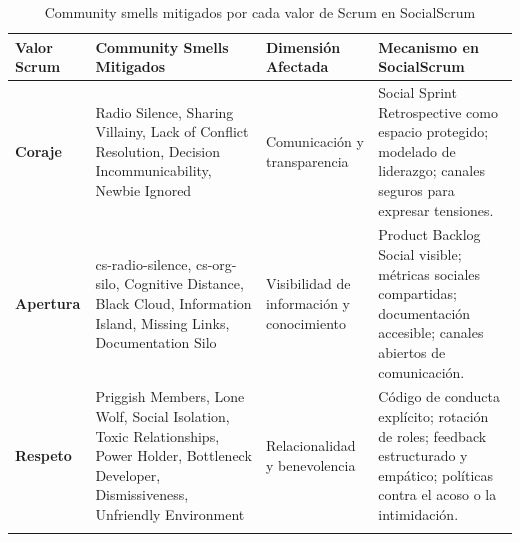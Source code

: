 \begin{table}[!htbp]
    \caption{Community smells mitigados por cada valor de Scrum en SocialScrum \cite{caballero2022communitysmells}}
    \label{tab:valores_smells}
    \centering
    \small
    \begin{tabular}{@{}p{2.2cm}p{4.2cm}p{3.2cm}p{4.3cm}@{}}
        \toprule
        \textbf{Valor Scrum}                                                                                                                                  & \textbf{Community Smells Mitigados} & \textbf{Dimensión Afectada} & \textbf{Mecanismo en SocialScrum} \\
        \midrule
        \textbf{Coraje}                                                                                                                                       &
        Radio Silence,  Sharing Villainy, Lack of Conflict Resolution, Decision Incommunicability, Newbie Ignored                                             &
        Comunicación y transparencia                                                                                                                          &
        Social Sprint Retrospective como espacio protegido; modelado de liderazgo; canales seguros para expresar tensiones.                                                                                                                                           \\
        \addlinespace
        \textbf{Apertura}                                                                                                                                     &
        \gls{cs-radio-silence}, \gls{cs-org-silo}, Cognitive Distance, Black Cloud, Information Island, Missing Links, Documentation Silo                     &
        Visibilidad de información y conocimiento                                                                                                             &
        Product Backlog Social visible; métricas sociales compartidas; documentación accesible; canales abiertos de comunicación.                                                                                                                                     \\
        \addlinespace

        \textbf{Respeto}                                                                                                                                      &
        Priggish Members, Lone Wolf, Social Isolation, Toxic Relationships, Power Holder, Bottleneck Developer, Dismissiveness, Unfriendly Environment        &
        Relacionalidad y benevolencia                                                                                                                         &
        Código de conducta explícito; rotación de roles; feedback estructurado y empático; políticas contra el acoso o la intimidación.                                                                                                                               \\
        \addlinespace


\end{tabular}
\end{table}
